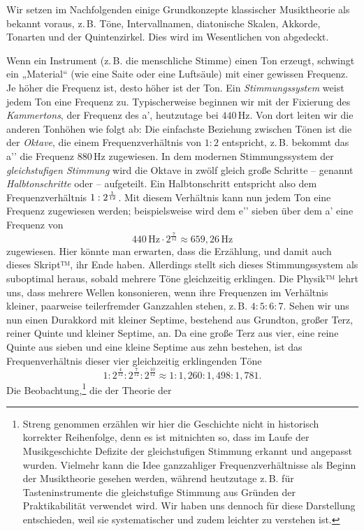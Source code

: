 Wir setzen im Nachfolgenden einige Grundkonzepte klassischer Musiktheorie als
bekannt voraus, z.\,B. Töne, Intervallnamen, diatonische Skalen, Akkorde,
Tonarten und der Quintenzirkel. Dies wird im Wesentlichen von
\cite[§\,1–6]{Skript} abgedeckt.

Wenn ein Instrument (z.\,B. die menschliche Stimme) einen Ton erzeugt, schwingt
ein „Material“ (wie eine Saite oder eine Luftsäule) mit einer gewissen Frequenz.
Je höher die Frequenz ist, desto höher ist der Ton. Ein \emph{Stimmungssystem}
weist jedem Ton eine Frequenz zu. Typischerweise beginnen wir mit der Fixierung
des \emph{Kammertons}, der Frequenz des a’, heutzutage bei $440$\,Hz. Von dort
leiten wir die anderen Tonhöhen wie folgt ab: Die einfachste Beziehung zwischen
Tönen ist die der \emph{Oktave}, die einem Frequenzverhältnis von $1:2$
entspricht, z.\,B. bekommt das a’’ die Frequenz $880$\,Hz zugewiesen. In dem
modernen Stimmungssystem der \emph{gleichstufigen Stimmung} wird die Oktave in
zwölf gleich große Schritte – genannt \emph{Halbtonschritte} oder  – 
aufgeteilt. Ein Halbtonschritt entspricht also dem Frequenzverhältnis
$1:2^{\smash{\frac1{12}}}$. Mit diesem Verhältnis kann nun jedem Ton eine
Frequenz zugewiesen werden; beispielsweise wird dem e’’ sieben 
über dem a’ eine Frequenz von 
\[440\,\text{Hz}\cdot 2^{\frac7{12}} \approx 659{,}26\,\text{Hz}\]%
zugewiesen. Hier könnte man erwarten, dass die Erzählung, und damit auch dieses
Skript™, ihr Ende haben. Allerdings stellt sich dieses Stimmungssystem als
suboptimal heraus, sobald mehrere Töne gleichzeitig erklingen. Die Physik™ lehrt
uns, dass mehrere Wellen konsonieren, wenn ihre Frequenzen im Verhältnis
kleiner, paarweise teilerfremder Ganzzahlen stehen, z.\,B. $4:5:6:7$. Sehen wir
uns nun einen Durakkord mit kleiner Septime, bestehend aus Grundton, großer Terz, reiner Quinte und kleiner Septime, an. Da eine große Terz aus vier, eine
reine Quinte aus sieben und eine kleine Septime aus zehn  bestehen,
ist das Frequenverhältnis dieser vier gleichzeitig erklingenden Töne
%
\[1:2^{\frac4{12}}:2^{\frac7{12}}:2^{\frac{10}{12}}\approx
  1:1{,}260:1{,}498:1{,}781.\]%
Die Beobachtung,\footnote{Streng genommen erzählen wir hier die Geschichte nicht
  in historisch korrekter Reihenfolge, denn es ist mitnichten so, dass im Laufe
  der Musikgeschichte Defizite der gleichstufigen Stimmung erkannt und angepasst
  wurden. Vielmehr kann die Idee ganzzahliger Frequenzverhältnisse als Beginn
  der Musiktheorie gesehen werden, während heutzutage z.\,B. für
  Tasteninstrumente die gleichstufige Stimmung aus Gründen der Praktikabilität
  verwendet wird. Wir haben uns dennoch für diese Darstellung entschieden, weil
  sie systematischer und zudem leichter zu verstehen ist.} die der Theorie der
